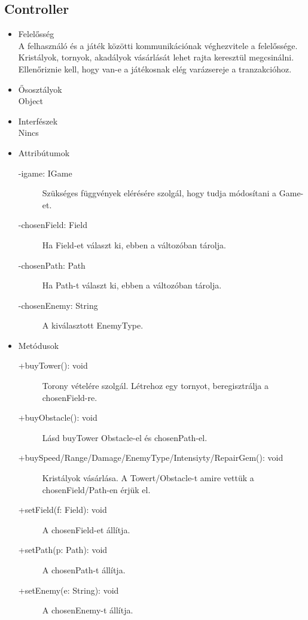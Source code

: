 \subsection{Controller}
\begin{itemize}
\item Felelősség\\
A felhasználó és a játék közötti kommunikációnak véghezvitele a felelőssége. Kristályok, tornyok, akadályok vásárlását lehet rajta keresztül megcsinálni. Ellenőriznie kell, hogy van-e a játékosnak elég varázsereje a tranzakcióhoz.
\item Ősosztályok\\
Object
\item Interfészek\\
Nincs
\item Attribútumok
	\begin{description}
		\item[-igame: IGame] Szükséges függvények elérésére szolgál, hogy tudja módosítani a Game-et. 
		\item[-chosenField: Field] Ha Field-et választ ki, ebben a változóban tárolja. 
		\item[-chosenPath: Path] Ha Path-t választ ki, ebben a változóban tárolja. 
		\item[-chosenEnemy: String] A kiválasztott EnemyType. 

		
	\end{description}
\item Metódusok
	\begin{description}
		
		\item[+buyTower(): void] Torony vételére szolgál. Létrehoz egy tornyot, beregisztrálja a chosenField-re. 
		\item[+buyObstacle(): void] Lásd buyTower Obstacle-el és chosenPath-el. 
		\item[+buySpeed/Range/Damage/EnemyType/Intensiyty/RepairGem(): void] Kristályok vásárlása. A Towert/Obstacle-t amire vettük a chosenField/Path-en érjük el. 
		\item[+setField(f: Field): void] A chosenField-et állítja. 
		\item[+setPath(p: Path): void] A chosenPath-t állítja. 
		\item[+setEnemy(e: String): void] A chosenEnemy-t állítja. 
		
		
		
	\end{description}
\end{itemize}

